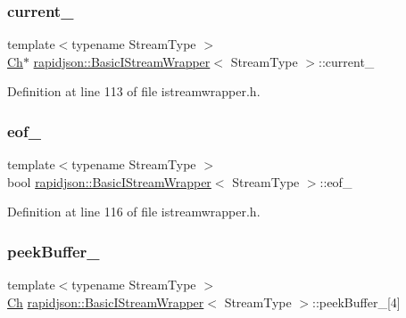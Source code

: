 \subsubsection{\texorpdfstring{current\_}{current\_}}
{\footnotesize\ttfamily template$<$typename Stream\+Type $>$ \\
\mbox{\hyperlink{classrapidjson_1_1_basic_i_stream_wrapper_a5fd972d8cd20b90ba0772aeebf122597}{Ch}}$\ast$ \mbox{\hyperlink{classrapidjson_1_1_basic_i_stream_wrapper}{rapidjson\+::\+Basic\+I\+Stream\+Wrapper}}$<$ Stream\+Type $>$\+::current\+\_\+\hspace{0.3cm}{\ttfamily [private]}}



Definition at line 113 of file istreamwrapper.\+h.

\mbox{\label{classrapidjson_1_1_basic_i_stream_wrapper_a444e02a06ab6e7ccedb19a8a28b06bb7}} 
\subsubsection{\texorpdfstring{eof\_}{eof\_}}
{\footnotesize\ttfamily template$<$typename Stream\+Type $>$ \\
bool \mbox{\hyperlink{classrapidjson_1_1_basic_i_stream_wrapper}{rapidjson\+::\+Basic\+I\+Stream\+Wrapper}}$<$ Stream\+Type $>$\+::eof\+\_\+\hspace{0.3cm}{\ttfamily [private]}}



Definition at line 116 of file istreamwrapper.\+h.

\mbox{\label{classrapidjson_1_1_basic_i_stream_wrapper_a43ca5844d6d394f13b176880f094adca}} 
\subsubsection{\texorpdfstring{peekBuffer\_}{peekBuffer\_}}
{\footnotesize\ttfamily template$<$typename Stream\+Type $>$ \\
\mbox{\hyperlink{classrapidjson_1_1_basic_i_stream_wrapper_a5fd972d8cd20b90ba0772aeebf122597}{Ch}} \mbox{\hyperlink{classrapidjson_1_1_basic_i_stream_wrapper}{rapidjson\+::\+Basic\+I\+Stream\+Wrapper}}$<$ Stream\+Type $>$\+::peek\+Buffer\+\_\+\mbox{[}4\mbox{]}\hspace{0.3cm}{\ttfamily [private]}}



